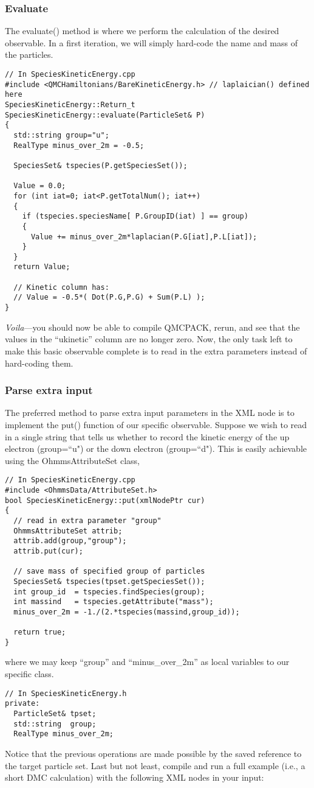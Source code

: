 \subsubsection{Evaluate}
The evaluate() method is where we perform the calculation of the desired observable. In a first iteration, we will simply hard-code the name and mass of the particles.
\begin{lstlisting}[style=C++]
// In SpeciesKineticEnergy.cpp
#include <QMCHamiltonians/BareKineticEnergy.h> // laplaician() defined here
SpeciesKineticEnergy::Return_t SpeciesKineticEnergy::evaluate(ParticleSet& P)
{
  std::string group="u";
  RealType minus_over_2m = -0.5;
  
  SpeciesSet& tspecies(P.getSpeciesSet());
  
  Value = 0.0;
  for (int iat=0; iat<P.getTotalNum(); iat++)
  {
    if (tspecies.speciesName[ P.GroupID(iat) ] == group)
    {
      Value += minus_over_2m*laplacian(P.G[iat],P.L[iat]);
    }
  }
  return Value;
  
  // Kinetic column has:
  // Value = -0.5*( Dot(P.G,P.G) + Sum(P.L) );
}
\end{lstlisting}
\textit{Voila}---you should now be able to compile QMCPACK, rerun, and see that the values in the ``ukinetic'' column are no longer zero. Now, the only task left to make this basic observable complete is to read in the extra parameters instead of hard-coding them.

\subsubsection{Parse extra input}
The preferred method to parse extra input parameters in the XML node is to implement the put() function of our specific observable. Suppose we wish to read in a single string that tells us whether to record the kinetic energy of the up electron (group=``u") or the down electron (group=``d"). This is easily achievable using the OhmmsAttributeSet class,
\begin{lstlisting}[style=C++]
// In SpeciesKineticEnergy.cpp
#include <OhmmsData/AttributeSet.h>
bool SpeciesKineticEnergy::put(xmlNodePtr cur)
{ 
  // read in extra parameter "group"
  OhmmsAttributeSet attrib;
  attrib.add(group,"group");
  attrib.put(cur);
  
  // save mass of specified group of particles
  SpeciesSet& tspecies(tpset.getSpeciesSet());
  int group_id  = tspecies.findSpecies(group);
  int massind   = tspecies.getAttribute("mass");
  minus_over_2m = -1./(2.*tspecies(massind,group_id));
  
  return true;
}
\end{lstlisting}
where we may keep ``group'' and ``minus\_over\_2m'' as local variables to our specific class.
\begin{lstlisting}[style=C++]
// In SpeciesKineticEnergy.h
private:
  ParticleSet& tpset;
  std::string  group;
  RealType minus_over_2m;
\end{lstlisting}
Notice that the previous operations are made possible by the saved reference to the target particle set. Last but not least, compile and run a full example (i.e., a short DMC calculation) with the following XML nodes in your input:

